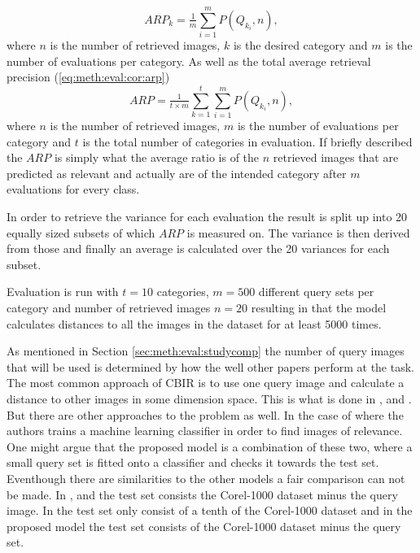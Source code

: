 \begin{equation}
\label{eq:meth:eval:cor:class_arp}
ARP_k = \tfrac{1}{m}\sum_{i=1}^{m}P(Q_{k_i}, n),
\end{equation}
where $n$ is the number of retrieved images, $k$ is the desired category and $m$ is the number of evaluations per category.
As well as the total average retrieval precision (\ref{eq:meth:eval:cor:arp})
\begin{equation}
\label{eq:meth:eval:cor:arp}
ARP = \tfrac{1}{t\times m}\sum_{k=1}^{t}\sum_{i=1}^{m}P(Q_{k_i}, n),
\end{equation}
where $n$ is the number of retrieved images, $m$ is the number of evaluations per category and $t$ is the total number of categories in evaluation. 
If briefly described the $ARP$ is simply what the average ratio is of the $n$ retrieved images that are predicted as relevant and actually are of the intended category after $m$ evaluations for every class.

In order to retrieve the variance for each evaluation the result is split up into 20 equally sized subsets of which $ARP$ is measured on. The variance is then derived from those and finally an average is calculated over the 20 variances for each subset. 

Evaluation is run with $t=10$ categories, $m=500$ different query sets per category and number of retrieved images $n=20$ resulting in that the model calculates distances to all the images in the dataset for at least 5000 times.

As mentioned in Section \ref{sec:meth:eval:studycomp} the number of query images that will be used is determined by how the well other papers perform at the task. The most common approach of CBIR is to use one query image and calculate a distance to other images in some dimension space. This is what is done in \cite{wang2001simplicity}, \cite{subrahmanyam2013modified} and \cite{nagaraja2015low}. But there are other approaches to the problem as well. In the case of \cite{elalami2014new} where the authors trains a machine learning classifier in order to find images of relevance. One might argue that the proposed model is a combination of these two, where a small query set is fitted onto a classifier and checks it towards the test set. Eventhough there are similarities to the other models a fair comparison can not be made. In \cite{wang2001simplicity}, \cite{subrahmanyam2013modified} and \cite{nagaraja2015low} the test set consists the Corel-1000 dataset minus the query image. In \cite{elalami2014new} the test set only consist of a tenth of the Corel-1000 dataset and in the proposed model the test set consists of the Corel-1000 dataset minus the query set.
